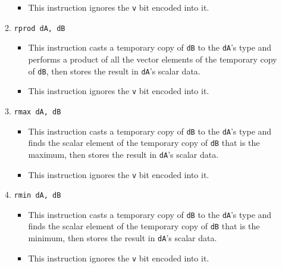 \documentclass{article}
\begin{document}
\begin{itemize}
\begin{enumerate}
\begin{itemize}
				\item This instruction ignores the \texttt{v} bit encoded
				into it.
				\end{itemize}
			\item \texttt{rprod dA, dB}
				\begin{itemize}
				\item This instruction casts a temporary copy of
				\texttt{dB} to the \texttt{dA}'s type and performs a
				product of all the vector elements of the temporary copy of
				\texttt{dB}, then stores the result in \texttt{dA}'s scalar
				data.

				\item This instruction ignores the \texttt{v} bit encoded
				into it.
				\end{itemize}
			\item \texttt{rmax dA, dB}
				\begin{itemize}
				\item This instruction casts a temporary copy of
				\texttt{dB} to the \texttt{dA}'s type and finds the scalar
				element of the temporary copy of \texttt{dB} that is the
				maximum, then stores the result in \texttt{dA}'s scalar
				data.

				\item This instruction ignores the \texttt{v} bit encoded
				into it.
				\end{itemize}
			\item \texttt{rmin dA, dB}
				\begin{itemize}
				\item This instruction casts a temporary copy of
				\texttt{dB} to the \texttt{dA}'s type and finds the scalar
				element of the temporary copy of \texttt{dB} that is the
				minimum, then stores the result in \texttt{dA}'s scalar
				data.

				\item This instruction ignores the \texttt{v} bit encoded
				into it.
				\end{itemize}
			\end{enumerate}
		\end{itemize}
		\newpage
\end{document}
